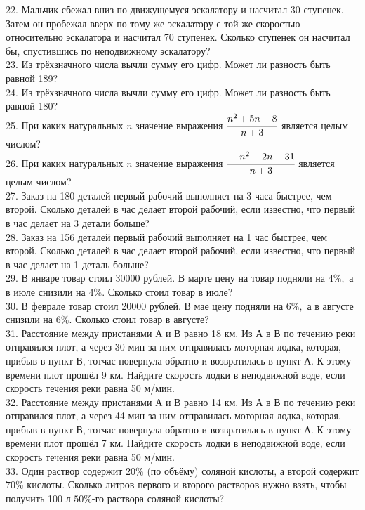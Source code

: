 \documentclass[12pt]{article}
\begin{document}
22. Мальчик сбежал вниз по движущемуся эскалатору и насчитал 30 ступенек. Затем он пробежал вверх по тому же эскалатору с той же скоростью относительно эскалатора и насчитал 70 ступенек. Сколько ступенек он насчитал бы, спустившись по неподвижному эскалатору?\\
23. Из трёхзначного числа вычли сумму его цифр. Может ли разность быть равной 189?\\
24. Из трёхзначного числа вычли сумму его цифр. Может ли разность быть равной 180?\\
25. При каких натуральных $n$ значение выражения $\cfrac{n^2+5n-8}{n+3}$ является целым числом?\\
26. При каких натуральных $n$ значение выражения $\cfrac{-n^2+2n-31}{n+3}$ является целым числом?\\
27. Заказ на 180 деталей первый рабочий выполняет на 3 часа быстрее, чем второй. Сколько деталей в час делает второй рабочий, если известно, что первый в час делает на 3 детали больше?\\
28. Заказ на 156 деталей первый рабочий выполняет на 1 час быстрее, чем второй. Сколько деталей в час делает второй рабочий, если известно, что первый в час делает на 1 деталь больше?\\
29. В январе товар стоил 30000 рублей. В марте цену на товар подняли на $4\%,$ а в июле снизили на $4\%.$ Сколько стоил товар в июле?\\
30. В феврале товар стоил 20000 рублей. В мае цену подняли на $6\%,$ а в августе снизили
на $6\%.$ Сколько стоил товар в августе?\\
31. Расстояние между пристанями А и В равно 18 км. Из А в В по течению реки отправился плот, а через 30 мин за ним отправилась моторная лодка, которая, прибыв в пункт В, тотчас повернула обратно и возвратилась в пункт А. К этому времени плот прошёл 9 км. Найдите скорость лодки в неподвижной воде, если скорость течения реки равна 50 м/мин.\\
32. Расстояние между пристанями А и В равно 14 км. Из А в В по течению реки отправился плот, а через 44 мин за ним отправилась моторная лодка, которая, прибыв в пункт В, тотчас повернула обратно и возвратилась в пункт А. К этому времени плот прошёл 7 км. Найдите скорость лодки в неподвижной воде, если скорость течения реки равна 50 м/мин.\\
33. Один раствор содержит $20\%$ (по объёму) соляной кислоты, а второй содержит $70\%$ кислоты. Сколько литров первого и второго растворов нужно взять, чтобы получить 100 л $50\%$-го раствора соляной кислоты?\\
\end{document}
